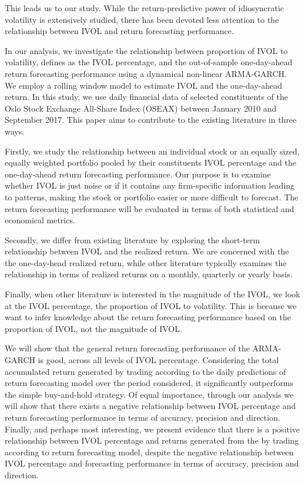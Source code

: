 This leads us to our study. While the return-predictive power of idiosyncratic volatility is extensively studied, there has been devoted less attention to the relationship between IVOL and return forecasting performance. 

In our analysis, we investigate the relationship between proportion of IVOL to volatility, defines as the IVOL percentage, and the out-of-sample one-day-ahead return forecasting performance using a dynamical non-linear ARMA-GARCH. We employ a rolling window model to estimate IVOL and the one-day-ahead return. In this study, we use daily financial data of selected constituents of the Oslo Stock Exchange All-Share Index (OSEAX) between January 2010 and September 2017. This paper aims to contribute to the existing literature in three ways. 

Firstly, we study the relationship between an individual stock or an equally sized, equally weighted portfolio pooled by their constituents IVOL percentage and the one-day-ahead return forecasting performance. Our purpose is to examine whether IVOL is just noise or if it contains any firm-specific information leading to patterns, making the stock or portfolio easier or more difficult to forecast. The return forecasting performance will be evaluated in terms of both statistical and economical metrics.

Secondly, we differ from existing literature by exploring the short-term relationship between IVOL and the realized return. We are concerned with the the one-day-head realized return, while other literature typically examines the relationship in terms of realized returns on a monthly, quarterly or yearly basis.

Finally, when other literature is interested in the magnitude of the IVOL, we look at the IVOL percentage, the proportion of IVOL to volatility. This is because we want to infer knowledge about the return forecasting performance based on the proportion of IVOL, not the magnitude of IVOL.

We will show that the general return forecasting performance of the ARMA-GARCH is good, across all levels of IVOL percentage. Considering the total accumulated return generated by trading according to the daily predictions of return forecasting model over the period considered, it significantly outperforms the simple buy-and-hold strategy. Of equal importance, through our analysis we will show that there exists a negative relationship between IVOL percentage and return forecasting performance in terms of accuracy, precision and direction. Finally, and perhaps most interesting, we present evidence that there is a positive relationship between IVOL percentage and returns generated from the by trading according to return forecasting model, despite the negative relationship between IVOL percentage and forecasting performance in terms of accuracy, precision and direction. 

